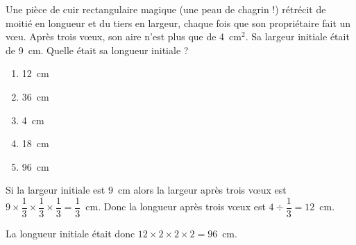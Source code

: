 Une pièce de cuir rectangulaire magique (une peau de chagrin !) rétrécit de moitié en longueur et du tiers en largeur, chaque fois que son propriétaire fait un v\oe u. Après trois v\oe ux, son aire n'est plus que de 4~cm$^2$. Sa largeur initiale était de 9~cm. Quelle était sa longueur initiale ?
\begin{multicols}{5}
  \begin{enumerate}[A/]
  \item 12~cm
  \item 36~cm
  \item 4~cm
  \item 18~cm
  \item 96~cm
  \end{enumerate}
\end{multicols}
Si la largeur initiale est 9~cm alors la largeur après trois v\oe ux est $9\times\dfrac13\times\dfrac13\times\dfrac13=\dfrac13$~cm. Donc la longueur après trois v\oe ux est $4\div\dfrac13=12$~cm.
\par La longueur initiale était donc $12\times2\times2\times2=96$~cm.